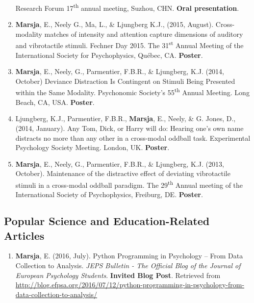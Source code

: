 \documentclass[]{article}
\providecommand{\tightlist}{%
  \setlength{\itemsep}{0pt}\setlength{\parskip}{0pt}}
\begin{document}
\begin{enumerate}
  Research Forum 17\textsuperscript{th} annual meeting, Suzhou, CHN.
  \textbf{Oral presentation}.
\item
  \textbf{Marsja}, E., Neely G., Ma, L., \& Ljungberg K.J., (2015,
  August). Cross-modality matches of intensity and attention capture
  dimensions of auditory and vibrotactile stimuli. Fechner Day 2015. The
  31\textsuperscript{st} Annual Meeting of the International Society for
  Psychophysics, Québec, CA. \textbf{Poster}.
\item
  \textbf{Marsja}, E., Neely, G., Parmentier, F.B.R., \& Ljungberg, K.J.
  (2014, October) Deviance Distraction Is Contingent on Stimuli Being
  Presented within the Same Modality. Psychonomic Society's
  55\textsuperscript{th} Annual Meeting. Long Beach, CA, USA.
  \textbf{Poster}.
\item
  Ljungberg, K.J., Parmentier, F.B.R., \textbf{Marsja}, E., Neely, \& G.
  Jones, D., (2014, January). Any Tom, Dick, or Harry will do: Hearing
  one's own name distracts no more than any other in a cross-modal
  oddball task. Experimental Psychology Society Meeting. London, UK.
  \textbf{Poster}.
\item
  \textbf{Marsja}, E., Neely, G., Parmentier, F.B.R., \& Ljungberg, K.J.
  (2013, October). Maintenance of the distractive effect of deviating
  vibrotactile stimuli in a cross-modal oddball paradigm. The
  29\textsuperscript{th} Annual meeting of the International Society of
  Psychophysics, Freiburg, DE. \textbf{Poster}.
\end{enumerate}

\hypertarget{popular-science-and-education-related-articles}{%
\subsection{Popular Science and Education-Related
Articles}\label{popular-science-and-education-related-articles}}

\begin{enumerate}
\def\labelenumi{\arabic{enumi}.}
\tightlist
\item
  \textbf{Marsja}, E. (2016, July). Python Programming in Psychology --
  From Data Collection to Analysis. \emph{JEPS Bulletin - The Official
  Blog of the Journal of European Psychology Students}. \textbf{Invited
  Blog Post}. Retrieved from \sloppy
  \url{http://blog.efpsa.org/2016/07/12/python-programming-in-psychology-from-data-collection-to-analysis/}
\end{enumerate}
\end{document}
